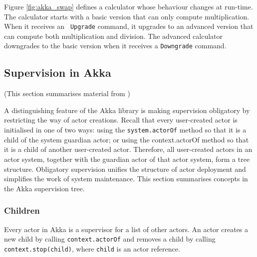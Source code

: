 Figure  \ref{fig:akka_swap} defines a calculator whose behaviour changes at 
run-time.
The calculator starts with a basic 
version that can only compute multiplication.  When it receives an {\tt 
Upgrade} command, it upgrades to an advanced version that
can compute both multiplication and division.  The advanced calculator
downgrades to the basic version when it
receives a {\tt Downgrade} command.  

\newpage

\subsection{Supervision in Akka}
\label{akka_supervision}
(This section summarises material from \citep[Section 2.4 and 3.4]{akka_doc})
\vspace{12 pt}

A distinguishing feature of the Akka library is making supervision obligatory 
by restricting the way of actor creations. Recall that every user-created actor 
is initialised in one of two ways: using the {\tt system.actorOf} method so that
it is a child of the system guardian actor; or using the {context.actorOf} method
so that it is a child of another user-created actor.  Therefore, all 
user-created actors in an actor system, together with the guardian actor of 
that actor system, form a tree structure. Obligatory supervision unifies the 
structure of actor deployment and simplifies the work of system maintenance.  
This section summarises concepts in the Akka supervision tree.


\subsubsection{Children}

Every actor in Akka is a supervisor for a list of other actors.  An actor 
creates a new child by calling {\tt context.actorOf} and removes a child 
by calling {\tt context.stop(child)}, where {\tt child} is an actor reference.

\begin{comment}
\begin{lstlisting}[language=scala]

val system = ActorSystem("mysystem")
val actor = system.acotOf(Props[MyActor], "myactor")


\end{lstlisting}

\begin{lstlisting}[language=scala]
class MyActor extends Actor {
  val child = context.actorOf(Props[Child], "mychild")
  // recieve etc.
}
\end{lstlisting}

\end{comment}

